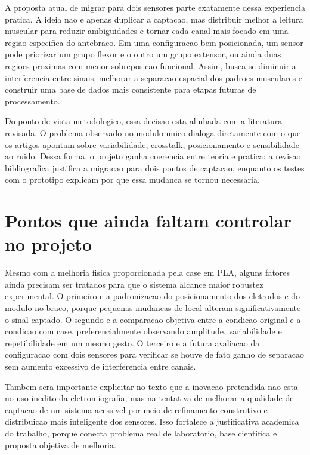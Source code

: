\documentclass[12pt,oneside,a4paper,english,brazilian]{abntex2}
\begin{document}
A proposta atual de migrar para dois sensores parte exatamente dessa experiencia pratica. A ideia nao e apenas duplicar a captacao, mas distribuir melhor a leitura muscular para reduzir ambiguidades e tornar cada canal mais focado em uma regiao especifica do antebraco. Em uma configuracao bem posicionada, um sensor pode priorizar um grupo flexor e o outro um grupo extensor, ou ainda duas regioes proximas com menor sobreposicao funcional. Assim, busca-se diminuir a interferencia entre sinais, melhorar a separacao espacial dos padroes musculares e construir uma base de dados mais consistente para etapas futuras de processamento.

Do ponto de vista metodologico, essa decisao esta alinhada com a literatura revisada. O problema observado no modulo unico dialoga diretamente com o que os artigos apontam sobre variabilidade, crosstalk, posicionamento e sensibilidade ao ruido. Dessa forma, o projeto ganha coerencia entre teoria e pratica: a revisao bibliografica justifica a migracao para dois pontos de captacao, enquanto os testes com o prototipo explicam por que essa mudanca se tornou necessaria.

\section{Pontos que ainda faltam controlar no projeto}

Mesmo com a melhoria fisica proporcionada pela case em PLA, alguns fatores ainda precisam ser tratados para que o sistema alcance maior robustez experimental. O primeiro e a padronizacao do posicionamento dos eletrodos e do modulo no braco, porque pequenas mudancas de local alteram significativamente o sinal captado. O segundo e a comparacao objetiva entre a condicao original e a condicao com case, preferencialmente observando amplitude, variabilidade e repetibilidade em um mesmo gesto. O terceiro e a futura avaliacao da configuracao com dois sensores para verificar se houve de fato ganho de separacao sem aumento excessivo de interferencia entre canais.

Tambem sera importante explicitar no texto que a inovacao pretendida nao esta no uso inedito da eletromiografia, mas na tentativa de melhorar a qualidade de captacao de um sistema acessivel por meio de refinamento construtivo e distribuicao mais inteligente dos sensores. Isso fortalece a justificativa academica do trabalho, porque conecta problema real de laboratorio, base cientifica e proposta objetiva de melhoria.
\end{document}
